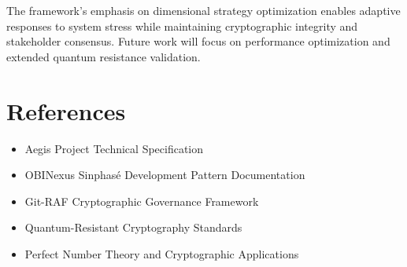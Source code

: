 \documentclass[a4paper,12pt]{article}
\begin{document}
The framework's emphasis on dimensional strategy optimization enables adaptive responses to system stress while maintaining cryptographic integrity and stakeholder consensus. Future work will focus on performance optimization and extended quantum resistance validation.

\section*{References}

\begin{itemize}
\item Aegis Project Technical Specification
\item OBINexus Sinphasé Development Pattern Documentation  
\item Git-RAF Cryptographic Governance Framework
\item Quantum-Resistant Cryptography Standards
\item Perfect Number Theory and Cryptographic Applications
\end{itemize}
\end{document}
